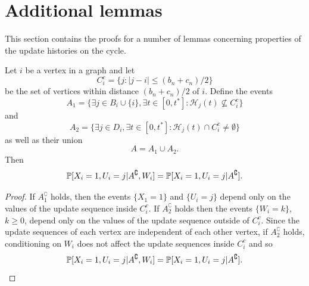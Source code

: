 	\section{Additional lemmas}
	\label{sec:additional lemmas 1D}
	This section contains the proofs for a number of lemmas concerning properties of the update histories on the cycle.

	\begin{lemma}
	\label{lem:conditioning on A removes conditioning on W}
		Let $i$ be a vertex in a graph and let
		\begin{equation}
			C_i^c = \{j : |j - i| \leq (b_n + c_n)/2\}
		\end{equation}
		be the set of vertices within distance $(b_n + c_n)/2$ of $i$. Define the events
		\begin{equation}
			A_1 = \{\exists j \in B_i \cup \{i\}, \exists t \in [0, t^*] : \mathcal{H}_j(t) \nsubseteq  C_i^c\}
		\end{equation}
		and
		\begin{equation}
			A_2 = \{\exists j \in D_i, \exists t \in [0, t^*] : \mathcal{H}_j(t) \cap C_i^c \neq \emptyset\}
		\end{equation}
		as well as their union
		\begin{equation}
			A = A_1 \cup A_2.
		\end{equation}
		Then
		\begin{equation}
			\mathbb{P}[X_i = 1, U_i = j | A^\complement, W_i] = \mathbb{P}[X_i = 1, U_i = j | A^\complement].
		\end{equation}
	\end{lemma}
	\begin{proof}
		If $A_1^\complement$ holds, then the events $\{X_1 = 1\}$ and $\{U_i = j\}$ depend only on the values of the update sequence inside $C_i^c$. If $A_2^\complement$ holds then the events $\{W_i = k\}$, $k \geq 0$, depend only on the values of the update sequence outside of $C_i^c$. Since the update sequences of each vertex are independent of each other vertex, if $A_2^\complement$ holds, conditioning on $W_i$ does not affect the update sequences inside $C_i^c$ and so 
		\begin{equation}
			\mathbb{P}[X_i = 1, U_i = j | A^\complement, W_i] = \mathbb{P}[X_i = 1, U_i = j | A^\complement].
		\end{equation}
	\end{proof}

